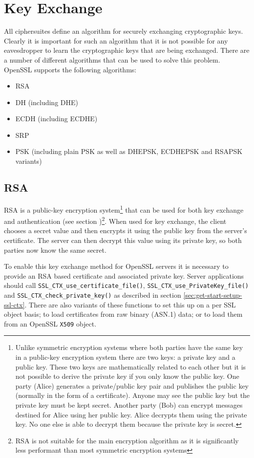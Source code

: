 \section{Key Exchange}

All ciphersuites define an algorithm for securely exchanging cryptographic 
keys. Clearly it is important for such an algorithm that it is not possible for 
any eavesdropper to learn the cryptographic keys that are being exchanged. 
There are a number of different algorithms that can be used to solve this 
problem. OpenSSL supports the following algorithms:
\begin{itemize}
\item RSA
\item DH (including DHE)
\item ECDH (including ECDHE)
\item SRP
\item PSK (including plain PSK as well as DHEPSK, ECDHEPSK and RSAPSK variants)
\end{itemize}

\subsection{RSA}

RSA is a public-key encryption system\footnote{Unlike symmetric encryption 
systems where both parties have the same key in a public-key encryption system 
there are two keys: a private key and a public key. These two keys are 
mathematically related to each other but it is not possible to derive the 
private key if you only know the public key. One party (Alice) generates a 
private/public key pair and publishes the public key (normally in the form of a 
certificate). Anyone may see the public key but the private key must be kept 
secret. Another party (Bob) can encrypt messages destined for Alice using 
her public key. Alice decrypts them using the private key. No one else is able 
to decrypt them because the private key is secret.} that can be used for both
key exchange and authentication (see section )\footnote{RSA is 
not suitable for the main encryption algorithm as it is significantly less 
performant than most symmetric encryption systems}. When used for key exchange, 
the client chooses a secret value and then encrypts it using the public key 
from the server's certificate. The server can then decrypt this value using its 
private key, so both parties now know the same secret.

To enable this key exchange method for OpenSSL servers it is necessary to 
provide an RSA based certificate and associated private key. Server 
applications should call \verb!SSL_CTX_use_certificate_file()!, 
\verb!SSL_CTX_use_PrivateKey_file()! and \verb!SSL_CTX_check_private_key()! as 
described in section \ref{sec:get-start-setup-ssl-ctx}. There are also variants 
of these functions to set this up on a per SSL object basis; to load 
certificates from raw binary (ASN.1) data; or to load them from an OpenSSL 
\verb!X509! object.

